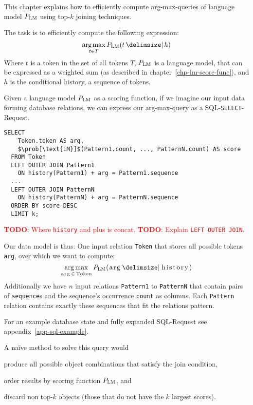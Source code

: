 \documentclass[11pt,a4paper]{report}
\DeclareMathOperator*{\argmax}{arg\,max}
\newcommand{\inlinecode}[1]{\lstinline[columns=fixed]{#1}}
\newcommand{\todo}[1]{\textcolor{red}{\textbf{TODO}: #1}}
\begin{document}
This chapter explains how to efficiently compute arg-max-queries of language
model $\prob[\text{LM}]$ using top-$k$ joining techniques.

The task is to efficiently compute the following expression:
\begin{equation}
  \argmax_{t \in T} \prob[\text{LM}]{t}{h}
\end{equation}
Where $t$ is a token in the set of all tokens $T$, $\prob[\text{LM}]$ is a
language model, that can be expressed as a weighted sum (as described in
chapter~\ref{chp-lm-score-func}), and $h$ is the conditional history, a sequence
of tokens.

Given a language model $\prob[\text{LM}]$ as a scoring function, if we
imagine our input data forming database relations, we can express our
arg-max-query as a SQL-\texttt{SELECT}-Request.

\begin{lstlisting}[mathescape]
  SELECT
    Token.token AS arg,
    $\prob[\text{LM}]$(Pattern1.count, ..., PatternN.count) AS score
  FROM Token
  LEFT OUTER JOIN Pattern1
    ON history(Pattern1) + arg = Pattern1.sequence
  ...
  LEFT OUTER JOIN PatternN
    ON history(PatternN) + arg = PatternN.sequence
  ORDER BY score DESC
  LIMIT k;
\end{lstlisting}

\todo{Where \inlinecode{history} and plus is concat.}
\todo{Explain \inlinecode{LEFT OUTER JOIN}.}

Our data model is thus: One input relation \inlinecode{Token} that stores
all possible tokens \inlinecode{arg}, over which we want to compute:
\[
\argmax_{\text{\inlinecode{arg}} \, \in \, \text{\inlinecode{Token}}}
  \prob[\text{LM}]{\text{\inlinecode{arg}}}{\text{\inlinecode{history}}}
\]
Additionally we have $n$ input relations
\inlinecode{Pattern1} to \inlinecode{PatternN} that contain pairs
of \inlinecode{sequence}s and the sequence's occurrence \inlinecode{count} as
columns.
Each \inlinecode{Pattern} relation contains exactly these sequences that fit the
relations pattern.

For an example database state and fully expanded SQL-Request see
appendix~\ref{app-sql-example}.

A naïve method to solve this query would
\begin{inparaenum}[(1)]
  \item produce all possible object combinations that satisfy the join
    condition,
  \item order results by scoring function $\prob[\text{LM}]$, and
  \item discard non top-$k$ objects (those that do not have the $k$ largest
    scores).
\end{inparaenum}
\end{document}
